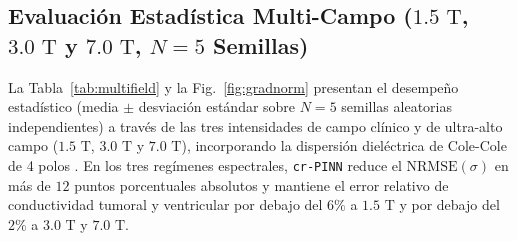 \documentclass[10pt,journal,compsoc]{IEEEtran}
\begin{document}
\subsection{\texorpdfstring{Evaluación Estadística Multi-Campo ($1.5\text{ T}$, $3.0\text{ T}$ y $7.0\text{ T}$, $N=5$ Semillas)}{Evaluación Estadística Multi-Campo (1.5 T, 3.0 T y 7.0 T, N=5 Semillas)}}
La Tabla~\ref{tab:multifield} y la Fig.~\ref{fig:gradnorm} presentan el desempeño estadístico (media $\pm$ desviación estándar sobre $N=5$ semillas aleatorias independientes) a través de las tres intensidades de campo clínico y de ultra-alto campo ($1.5\text{ T}$, $3.0\text{ T}$ y $7.0\text{ T}$), incorporando la dispersión dieléctrica de Cole-Cole de 4 polos \cite{gabriel1996dielectric}. En los tres regímenes espectrales, \texttt{cr-PINN} reduce el $\text{NRMSE}(\sigma)$ en más de $12$ puntos porcentuales absolutos y mantiene el error relativo de conductividad tumoral y ventricular por debajo del $6\%$ a $1.5\text{ T}$ y por debajo del $2\%$ a $3.0\text{ T}$ y $7.0\text{ T}$.
\end{document}
